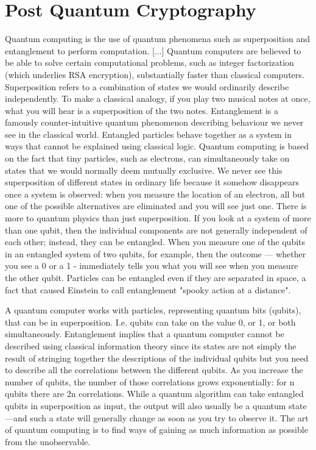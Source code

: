 \chapter{Post Quantum Cryptography}

Quantum computing is the use of quantum phenomena such as superposition and entanglement to perform computation. [...] Quantum computers are believed to be able to solve certain computational problems, such as integer factorization (which underlies RSA encryption), substantially faster than classical computers.
Superposition refers to a combination of states we would ordinarily describe independently.
To make a classical analogy, if you play two musical notes at once, what you will hear is a superposition of the two notes.
Entanglement is a famously counter-intuitive quantum phenomenon describing behaviour we never see in the classical world. Entangled particles behave together as a system in ways that cannot be explained using classical logic.
Quantum computing is based on the fact that tiny particles, such as electrons, can simultaneously take on states that we would normally deem mutually exclusive. We never see this superposition of different states in ordinary life because it somehow disappears once a system is observed: when
you measure the location of an electron, all but one of the possible alternatives are eliminated and you will see just one.
There is more to quantum physics than just superposition. If you look at a system of more than one qubit, then the individual components are not generally independent of each other; instead, they can be entangled. When you measure one of the qubits in an entangled system of two qubits, for example, then the outcome — whether you see a 0 or a 1 - immediately tells you what you will see when you measure the other qubit. Particles can be entangled even if they are separated in space, a fact that caused Einstein to call entanglement "spooky action at a distance".

A quantum computer works with particles, representing quantum bits (qubits), that can be in superposition. I.e. qubits can take on the value 0, or 1, or both simultaneously. Entanglement implies that a quantum computer cannot be described using classical information theory since its states are not simply the result of stringing together the descriptions of the individual qubits but you need to describe all the correlations between the different qubits. As you increase the number of qubits, the number of those correlations grows exponentially: for n qubits there are 2n correlations. While a quantum algorithm can take entangled qubits in superposition as input, the output will also usually be a quantum state —and such a state will generally change as soon as you try to observe it. The art of quantum computing is to find ways of gaining as much information as possible from the unobservable.

